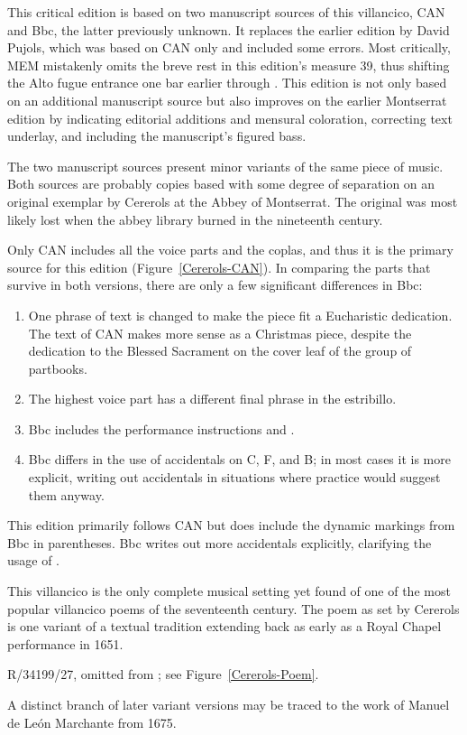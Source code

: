 This critical edition is based on two manuscript sources of this villancico, 
CAN and Bbc, the latter previously unknown.
It replaces the earlier edition by David Pujols, which was based on CAN only 
and included some errors.
Most critically, MEM mistakenly omits the breve rest in this edition's measure 
39, thus shifting the Alto fugue entrance one bar earlier through .
This edition is not only based on an additional manuscript source but also 
improves on the earlier Montserrat edition by indicating editorial additions 
and mensural coloration, correcting text underlay, and including the 
manuscript's figured bass.

The two manuscript sources present minor variants of the same piece of music.
Both sources are probably copies based with some degree of separation on an 
original exemplar by Cererols at the Abbey of Montserrat.
The original was most likely lost when the abbey library burned in the 
nineteenth century.

Only CAN includes all the voice parts and the coplas, and thus it is the 
primary source for this edition (Figure~\ref{Cererols-CAN}).%
  \autocite[60--61]{Bonastre:CanetCatalog}
In comparing the parts that survive in both versions, there are only a few 
significant differences in Bbc: 
\begin{enumerate}
    \item One phrase of text is changed to make the piece fit a Eucharistic
        dedication.  
        The text of CAN makes more sense as a Christmas piece, despite the
        dedication to the Blessed Sacrament on the cover leaf of the group of
        partbooks.
    \item The highest voice part has a different final phrase in the estribillo.
    \item Bbc includes the performance instructions  and .
    \item Bbc differs in the use of accidentals on C, F, and B; in most cases
        it is more explicit, writing out accidentals in situations where
         practice would suggest them anyway.
\end{enumerate}
This edition primarily follows CAN but does include the dynamic markings from 
Bbc in parentheses.
Bbc writes out more accidentals explicitly, clarifying the usage of .



This villancico is the only complete musical setting yet found of one of the 
most popular villancico poems of the seventeenth century.
The poem as set by Cererols is one variant of a textual tradition extending 
back as early as a Royal Chapel performance in 1651.%
\begin{Footnote}
    \signature{E-Mn}{R/34199/27}, omitted from \autocite{BNE:VCs17C}; see
    Figure~\ref{Cererols-Poem}.
\end{Footnote}
A distinct branch of later variant versions may be traced to the work of Manuel 
de León Marchante from 1675.

